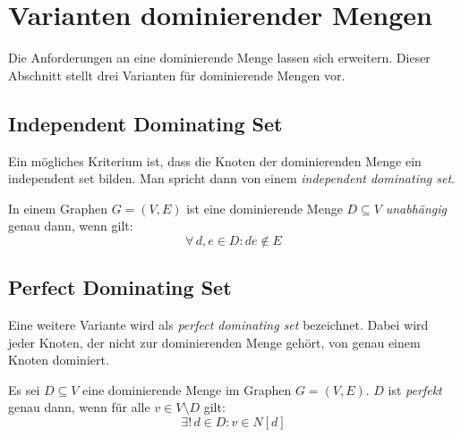 %
%

\section{Varianten dominierender Mengen}\label{sec:DomVar}
Die Anforderungen an eine dominierende Menge lassen sich erweitern. Dieser Abschnitt stellt drei Varianten für dominierende Mengen vor.

\subsection{Independent Dominating Set}
Ein mögliches Kriterium ist, dass die Knoten der dominierenden Menge ein independent set bilden. Man spricht dann von einem \emph{independent dominating set}.

\begin{mydef}
    In einem Graphen $G=(V,E)$ ist eine dominierende Menge $D \subseteq V$ \emph{unabhängig} genau dann, wenn gilt:
    \[\forall \, d,e \in D: de \notin E\]
\end{mydef}

\subsection{Perfect Dominating Set}
Eine weitere Variante wird als \emph{perfect dominating set} bezeichnet. Dabei wird jeder Knoten, der nicht zur dominierenden Menge gehört, von genau einem Knoten dominiert.

\begin{mydef}
    Es sei $D \subseteq V$ eine dominierende Menge im Graphen $G=(V,E)$. $D$ ist \emph{perfekt} genau dann, wenn für alle $v \in V \setminus D$ gilt:
    \[ \exists !\, d \in D: v \in N[d] \]
\end{mydef}


